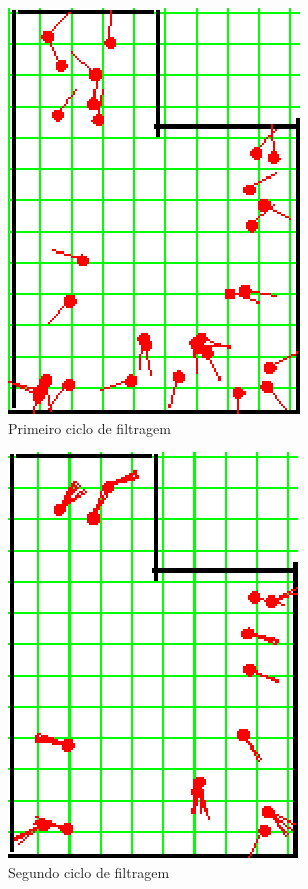 \begin{figure}[H]
  \centering
  \includegraphics[scale=1]{figuras/cen3_ex1/2.eps}
  \caption[Primeiro Ciclo de Filtragem]{Primeiro ciclo de filtragem}
  \label{img:cen3_ex1_2}
\end{figure}

\begin{figure}[H]
  \centering
  \includegraphics[scale=1]{figuras/cen3_ex1/3.eps}
  \caption[Segundo Ciclo de Filtragem]{Segundo ciclo de filtragem}
  \label{img:cen3_ex1_3}
\end{figure}

